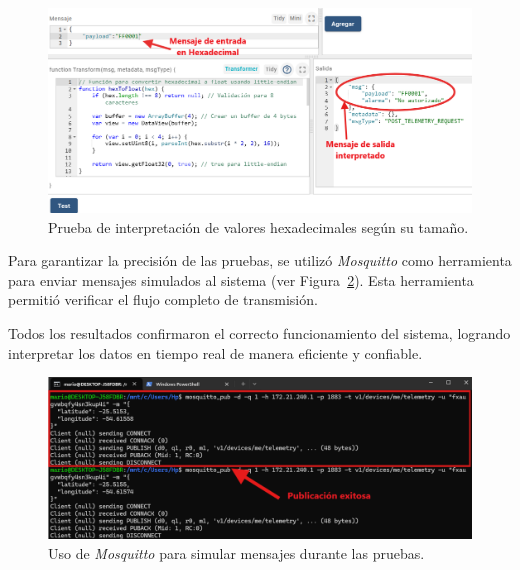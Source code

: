 \begin{figure}[H]
\leavevmode
\begin{minipage}{\textwidth}
\begin{center}
\includegraphics[scale=0.5]{./capitulo_05/imagen/resmon/hextto (1).png}
\caption{Prueba de interpretación de valores hexadecimales según su tamaño.\label{fig:tohex}}
\end{center}
\end{minipage}
\end{figure}

Para garantizar la precisión de las pruebas, se utilizó \textit{Mosquitto} como herramienta para enviar mensajes simulados al sistema (ver Figura~\ref{fig:mosqu_p}). Esta herramienta permitió verificar el flujo completo de transmisión.

Todos los resultados confirmaron el correcto funcionamiento del sistema, logrando interpretar los datos en tiempo real de manera eficiente y confiable.


\begin{figure}[H]
\leavevmode
\begin{minipage}{\textwidth}
\begin{center}
\includegraphics[width=\textwidth]{./capitulo_05/imagen/resmon/mosquitt.png}
\caption{Uso de \textit{Mosquitto} para simular mensajes durante las pruebas.\label{fig:mosqu_p}}
\end{center}
\end{minipage}
\end{figure}

